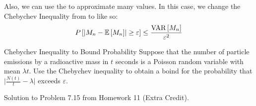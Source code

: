 Also, we can use the  to approximate many values. In this case, we change the Chebychev Inequality from  to  like so:
\begin{equation}\label{eq:Statistics Chebychev Inequality}
  P \left[ \lvert M_{n} - \operatorname{\operatorname{\mathbb{E}}} \left[ M_{n} \right] \rvert \geq \varepsilon \right] \leq \frac{\operatorname{\operatorname{VAR}} \left[ M_{n} \right]}{\varepsilon^{2}}
\end{equation}
\begin{example}[Problem 7.15]{Chebychev Inequality to Bound Probability}
  Suppose that the number of particle emissions by a radioactive mass in $t$ seconds is a Poisson random variable with mean $\lambda t$.
  Use the Chebychev inequality to obtain a boind for the probability that $\lvert \frac{N \left( t \right)}{t} - \lambda \rvert$ exceeds $\varepsilon$.

  \tcblower

  Solution to Problem 7.15 from Homework 11 (Extra Credit).
\end{example}

